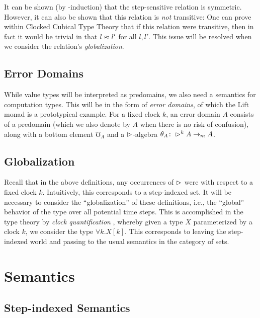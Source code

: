 It can be shown (by \lob-induction) that the step-sensitive relation is symmetric.
However, it can also be shown that this relation is \emph{not} transitive:
One can prove within Clocked Cubical Type Theory
that if this relation were transitive, then in fact it would be trivial in that
$l \approx l'$ for all $l, l'$.
This issue will be resolved when we consider the relation's \emph{globalization}.



\subsection{Error Domains}

While value types will be interpreted as predomains, we also need a semantics
for computation types. This will be in the form of \emph{error domains}, of which the
Lift monad is a prototypical example. For a fixed clock $k$, an error domain $A$
consists of a predomain (which we also denote by $A$ when there is no risk of confusion),
along with a bottom element $\mho_A$ and a $\vartriangleright$-algebra $\theta_A \colon \vartriangleright^k A \to_m A$.


\subsection{Globalization}\label{sec:globalization}

Recall that in the above definitions, any occurrences of $\vartriangleright$ were with
respect to a fixed clock $k$. Intuitively, this corresponds to a step-indexed set.
It will be necessary to consider the ``globalization'' of these definitions,
i.e., the ``global'' behavior of the type over all potential time steps.
This is accomplished in the type theory by \emph{clock quantification} \cite{atkey-mcbride2013},
whereby given a type $X$ parameterized by a clock $k$, we consider the type
$\forall k. X[k]$. This corresponds to leaving the step-indexed world and passing to
the usual semantics in the category of sets.


\section{Semantics}\label{sec:semantics}

\subsection{Step-indexed Semantics}

